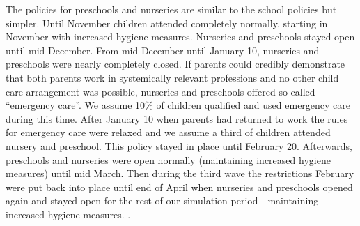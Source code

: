 The policies for preschools and nurseries are similar to the school policies but simpler.
Until November children attended completely normally, starting in November with increased
hygiene measures. Nurseries and preschools stayed open until mid December. From mid
December until January 10, nurseries and preschools were nearly completely closed. If
parents could credibly demonstrate that both parents work in systemically relevant
professions and no other child care arrangement was possible, nurseries and preschools
offered so called ``emergency care''. We assume 10\% of children qualified and used
emergency care during this time. After January 10 when parents had returned to work the
rules for emergency care were relaxed and we assume a third of children attended nursery
and preschool. This policy stayed in place until February 20. Afterwards, preschools and
nurseries were open normally (maintaining increased hygiene measures) until mid March.
Then during the third wave the restrictions February were put back into place until end
of April when nurseries and preschools opened again and stayed open for the rest of our
simulation period - maintaining increased hygiene measures. \citep{KiTa_BY, KiTa_NRW,
KiTa_BW, KiTa_BWa, KiTa_BYa, schoolBWb}.
